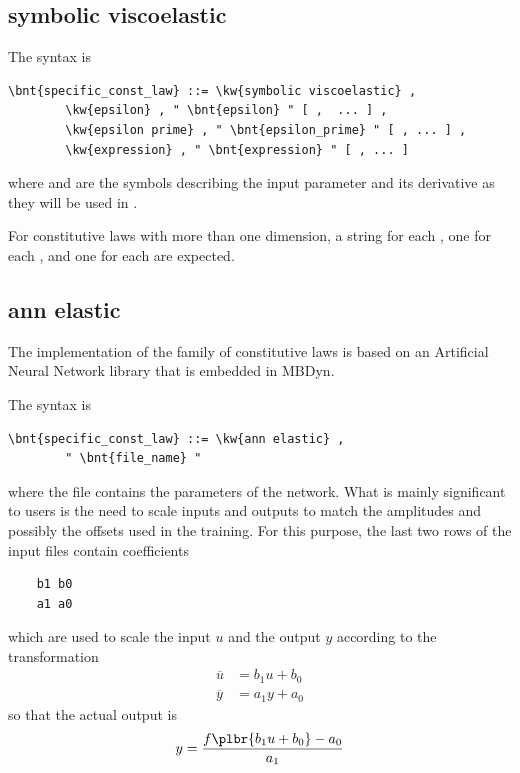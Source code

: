 \subsection{symbolic viscoelastic}\label{sec:CL:SYMBOLIC-VISCOELASTIC}
The syntax is
\begin{Verbatim}[commandchars=\\\{\}]
    \bnt{specific_const_law} ::= \kw{symbolic viscoelastic} ,
        \kw{epsilon} , " \bnt{epsilon} " [ ,  ... ] ,
        \kw{epsilon prime} , " \bnt{epsilon_prime} " [ , ... ] ,
        \kw{expression} , " \bnt{expression} " [ , ... ]
\end{Verbatim}
where  and  are the symbols describing 
the input parameter and its derivative as they will be used
in .

For constitutive laws with more than one dimension,
a string for each , one for each ,
and one for each  are expected.

\subsection{ann elastic}\label{sec:CL:ANN-ELASTIC}
The implementation  of the family of  constitutive laws
is based on an Artificial Neural Network library that is embedded in MBDyn.

The syntax is
\begin{Verbatim}[commandchars=\\\{\}]
    \bnt{specific_const_law} ::= \kw{ann elastic} ,
        " \bnt{file_name} "
\end{Verbatim}
where the file  contains the parameters of the network.
What is mainly significant to users is the need to scale inputs and outputs
to match the amplitudes and possibly the offsets used in the training.
For this purpose, the last two rows of the input files contain coefficients
\begin{verbatim}
    b1 b0
    a1 a0
\end{verbatim}
which are used to scale the input $u$ and the output $y$ according
to the transformation
\begin{align}
	\overline{u} &= b_1 u + b_0 \\
	\overline{y} &= a_1 y + a_0
\end{align}
so that the actual output is
\begin{equation}
	y = \frac{f\plbr{b_1 u + b_0} - a_0}{a_1}
\end{equation}

